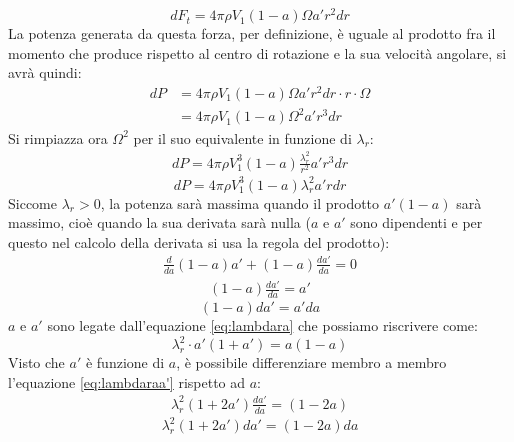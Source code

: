 \begin{equation}\label{eq:dftfin}
dF_t = 4 \pi \rho V_1 \left(1-a \right) \Omega a' r^2 dr
\end{equation}
La potenza generata da questa forza, per definizione, è uguale al prodotto fra il momento che produce rispetto al centro di rotazione e la sua velocità angolare, si avrà quindi:
\begin{align*}
dP &= 4 \pi \rho V_1 \left( 1-a \right) \Omega a' r^2 dr \cdot r \cdot \Omega \\
&= 4 \pi \rho V_1 \left( 1-a \right) \Omega^2 a' r^3 dr
\end{align*}
Si rimpiazza ora $\Omega^2$ per il suo equivalente in funzione di $\lambda_r$:
\begin{align*}
dP = 4 \pi \rho V_1^3 \left( 1- a \right) \frac{\lambda_r^2}{r^2} a' r^3 dr
\end{align*}
\begin{equation}\label{eq:dP}
dP = 4 \pi \rho V_1^3 \left( 1 - a \right) \lambda_r^2 a' r dr
\end{equation}
Siccome $\lambda_r > 0$, la potenza sarà massima quando il prodotto $a' \left( 1- a \right)$ sarà massimo, cioè quando la sua derivata sarà nulla ($a$ e $a'$ sono dipendenti e per questo nel calcolo della derivata si usa la regola del prodotto):
\begin{align*}
\frac{d}{da} \left( 1-a \right) a' + \left( 1 -a \right) \frac{da'}{da} = 0
\end{align*}
\begin{align*}
\left( 1- a \right) \frac{da'}{da} = a'
\end{align*}
\begin{equation}\label{eq:aa'}
\left(1 - a \right) da' = a' da
\end{equation}
$a$ e $a'$ sono legate dall'equazione \ref{eq:lambdara} che possiamo riscrivere come:
\begin{equation}\label{eq:lambdaraa'}
\lambda_r^2 \cdot a' \left( 1+ a' \right) = a \left( 1 - a \right)
\end{equation}
Visto che $a'$ è funzione di $a$, è possibile differenziare membro a membro l'equazione \ref{eq:lambdaraa'} rispetto ad $a$:
\begin{align*}
\lambda_r^2 \left( 1+ 2a' \right) \frac{da'}{da} = \left( 1 - 2a \right)
\end{align*}
\begin{equation}\label{eq:lambdaaa'}
\lambda_r^2 \left( 1+ 2a' \right) da' = \left( 1 - 2a \right)da
\end{equation}
